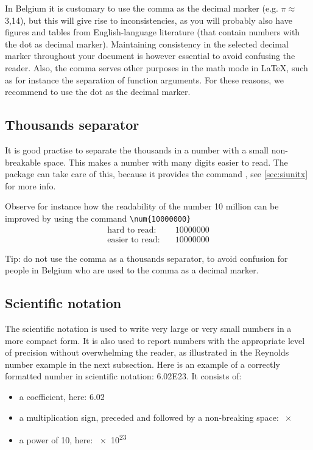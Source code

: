 In Belgium it is customary to use the comma as the decimal marker (e.g. $\pi\approx$ 3,14), but this will give rise to inconsistencies, as you will probably also have figures and tables from English-language literature (that contain numbers with the dot as decimal marker). Maintaining consistency in the selected decimal marker throughout your document is however essential to avoid confusing the reader. Also, the comma serves other purposes in the math mode in \LaTeX, such as for instance the separation of function arguments. For these reasons, we recommend to use the dot as the decimal marker.

\subsection{Thousands separator}
It is good practise to separate the thousands in a number with a small non-breakable space. This makes a number with many digits easier to read. The  package can take care of this, because it provides the command ,  see \cref{sec:siunitx} for more info.

Observe for instance how the readability of the number 10 million can be improved by using the command \verb|\num{10000000}|
\begin{align*}
    \text{hard to read:}     \quad &        10000000\\
    \text{easier to read:}   \quad &   \num{10000000}
\end{align*}

Tip: do not use the comma as a thousands separator, to avoid confusion for people in Belgium who are used to the comma as a decimal marker.

\subsection{Scientific notation}
The scientific notation is used to write very large or very small numbers in a more compact form. It is also used to report numbers with the appropriate level of precision without overwhelming the reader, as illustrated in the Reynolds number example in the next subsection. Here is an example of a correctly formatted number in scientific notation: \num{6.02E23}. It consists of:
\begin{itemize}
    \item a coefficient, here: 6.02
    \item a multiplication sign, preceded and followed by a non-breaking space: $\ \times\ $
    \item a power of 10, here: \num{e23}
\end{itemize}


